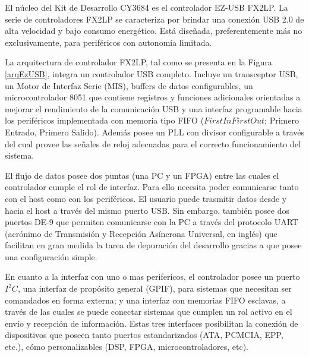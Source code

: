 El núcleo del Kit de Desarrollo CY3684 es el controlador EZ-USB FX2LP. La serie de controladores FX2LP se caracteriza por brindar una conexión USB 2.0 de alta velocidad y bajo consumo energético. Está diseñada, preferentemente más no exclusivamente, para periféricos con autonomía limitada.

La arquitectura de controlador FX2LP, tal como se presenta en la Figura \ref{arqEzUSB}, integra un controlador USB completo. Incluye un transceptor USB, un Motor de Interfaz Serie (MIS), buffers de datos configurables, un microcontrolador 8051 que contiene registros y funciones adicionales orientadas a mejorar el rendimiento de la comunicación USB y una interfaz programable hacia los periféricos implementada con memoria tipo FIFO (\(First In First Out\); Primero Entrado, Primero Salido). Además posee un PLL con divisor configurable a través del cual provee las señales de reloj adecuadas para el correcto funcionamiento del sistema.%

El flujo de datos posee dos puntas (una PC y un FPGA) entre las cuales el controlador cumple el rol de interfaz. Para ello necesita poder comunicarse tanto con el host como con los periféricos. El usuario puede trasmitir datos desde y hacia el host a través del mismo puerto USB. Sin embargo, también posee dos puertos DE-9 que permiten comunicarse con la PC a través del protocolo UART (acrónimo de Transmisión y Recepción Asíncrona Universal, en inglés) que facilitan en gran medida la tarea de depuración del desarrollo gracias a que posee una configuración simple.

En cuanto a la interfaz con uno o mas perifericos, el controlador posee un puerto $I^2C$, una interfaz de propósito general (GPIF), para sistemas que necesitan ser comandados en forma externa; y una interfaz con memorias FIFO esclavas, a través de las cuales se puede conectar sistemas que cumplen un rol activo en el envío y recepción de información. Estas tres interfaces posibilitan la conexión de dispositivos que poseen tanto puertos estandarizados (ATA, PCMCIA, EPP, etc.), cómo personalizables (DSP, FPGA, microcontroladores, etc).

 

